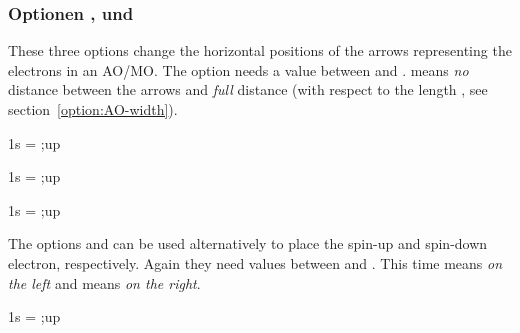 \documentclass[load-preamble+]{cnltx-doc}
\begin{document}
\subsubsection{Optionen ,  und
  }
\label{option:electrons}

These three options change the horizontal positions of the arrows representing
the electrons in an \ac{AO}/\ac{MO}. The option  needs a
value between  and .  means \emph{no} distance between
the arrows and  \emph{full} distance (with respect to the length
, see section~\ref{option:AO-width}).

\begin{example}
  \begin{MOdiagram}[el-sep=.2]%
     { 1s = {;up} }
  \end{MOdiagram}
\end{example}

\begin{example}
  \begin{MOdiagram}[el-sep=0]
     { 1s = {;up} }
  \end{MOdiagram}
\end{example}

\begin{example}
   \begin{MOdiagram}[el-sep=1]
     { 1s = {;up} }
  \end{MOdiagram}
\end{example}

The options  and  can be used
alternatively to place the spin-up and spin-down electron, respectively.
Again they need values between  and .  This time 
means \emph{on the left} and  means \emph{on the right}.

\begin{example}
  \begin{MOdiagram}[up-el-pos=.4,down-el-pos=.6]%
     { 1s = {;up} }
  \end{MOdiagram}
\end{example}
\end{document}
